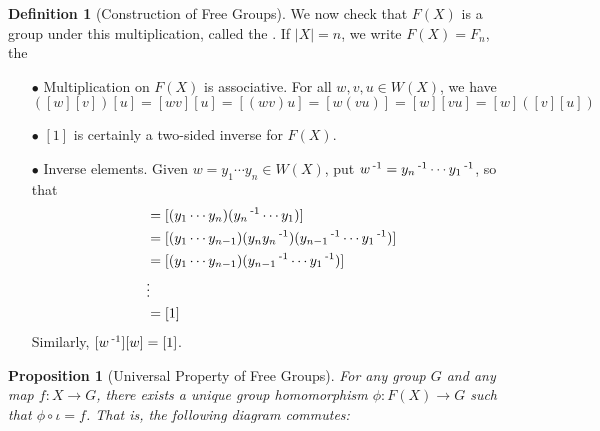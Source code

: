 \documentclass[11pt]{book}
\newcounter{counter}
\newtheorem{proposition}[counter]{Proposition}   \newtheorem{problem}[counter]{Problem}   \newtheorem*{proposition*}{Proposition}   \newtheorem*{lemma*}{Lemma}
\theoremstyle{definition}   \newtheorem{defn}[counter]{Definition} %
\DeclareMathOperator{\ra}{\rightarrow}   \DeclareMathOperator{\Poly}{\mathbf{P}}   \DeclareMathOperator{\spn}{\textnormal{span}}   \DeclareMathOperator{\aut}{\textnormal{Aut}}
\newcommand{\vs}{\vspace{8pt}}
\numberwithin{counter}{chapter}
\begin{document}
\begin{defn}[Construction of Free Groups]
We now check that $F(X)$ is a group under this multiplication, called the . If $|X| = n$, we write $F(X) = F_n$, the 
\begin{enumerate}
\item[$\bullet$] Multiplication on $F(X)$ is associative. For all $w,v,u \in W(X)$, we have
	\[([w][v])[u] = [wv][u] = [(wv)u] = [w(vu)] = [w][vu] = [w]([v][u]) \]
\item[$\bullet$] $[1]$ is certainly a two-sided inverse for $F(X)$.
\item[$\bullet$] Inverse elements. Given $w = y_1 \cdots y_n \in W(X)$, put $w\operatorname{^{-1}} = y_n \operatorname{^{-1}} \cdots y_1 \operatorname{^{-1}}$, so that
	\begin{align*}
	[w][w\inv] &= [(y_1\cdots y_n)(y_n\inv \cdots y_1)] \\
	&= [(y_1 \cdots y_{n-1})(y_ny_n\inv)(y_{n-1}\inv \cdots y_1\inv)] \\
	&= [(y_1 \cdots y_{n-1})(y_{n-1}\inv \cdots y_1\inv)] \\
	&\vdots \\
	&= [1]
	\end{align*}
Similarly, $[w\operatorname{^{-1}}][w] = [1]$.
\end{enumerate}
\end{defn}

\vs

\begin{proposition}[Universal Property of Free Groups]
For any group $G$ and any map $f : X \ra G$, there exists a unique group homomorphism $\phi : F(X) \ra G$ such that $\phi \circ \iota = f$. That is, the following diagram commutes:

\begin{center}
\end{center}
\end{proposition}
\end{document}
